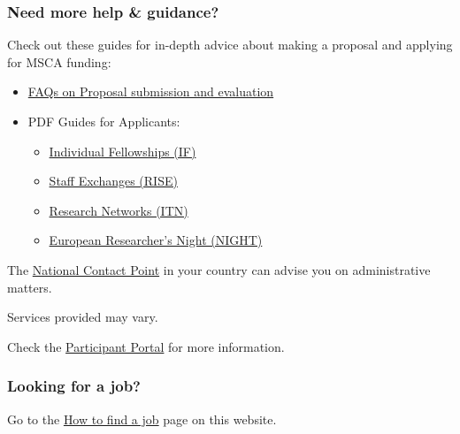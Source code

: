\documentclass[oneside]{book}
\numberwithin{equation}{section}
\begin{document}
\subsubsection{Need more help \& guidance?}
Check out these guides for in-depth advice about making a proposal and applying for MSCA funding:
\begin{itemize}
    \item \href{https://ec.europa.eu/research/participants/portal/desktop/en/support/faq.html#c,faqs=categoryMachineName/t/pp_roles_and_rights/0/1/1&categoryMachineName/t/p_registration/0/1/1&categoryMachineName/t/work_programme_calls/0/1/1&categoryMachineName/t/p_submission_eval/1/1/1&categoryMachineName/t/ethics_research_integrity/0/1/1&category}{FAQs on Proposal submission and evaluation}
    \item PDF Guides for Applicants:
    \begin{itemize}
        \item \href{http://ec.europa.eu/research/participants/data/ref/h2020/other/guides_for_applicants/h2020-guide-appl-msca-if-2018-20_en.pdf}{Individual Fellowships (IF)}
        \item \href{http://ec.europa.eu/research/participants/data/ref/h2020/other/guides_for_applicants/h2020-guide-appl-msca-rise_en.pdf}{Staff Exchanges (RISE)}
        \item \href{http://ec.europa.eu/research/participants/data/ref/h2020/other/guides_for_applicants/h2020-guide-appl-msca-itn_en.pdf}{Research Networks (ITN)}
        \item \href{http://ec.europa.eu/research/participants/data/ref/h2020/other/guides_for_applicants/h2020-guide-appl-msca-night-2018_en.pdf}{European Researcher's Night (NIGHT)}
    \end{itemize}
\end{itemize}
The \href{http://ec.europa.eu/research/participants/portal/desktop/en/support/national_contact_points.html}{National Contact Point} in your country can advise you on administrative matters.

Services provided may vary.

Check the \href{http://ec.europa.eu/research/participants/portal/desktop/en/home.html}{Participant Portal} for more information.

\subsubsection{Looking for a job?}
Go to the \href{https://ec.europa.eu/research/mariecurieactions/how-to/find-job_en}{How to find a job} page on this website.
\end{document}
